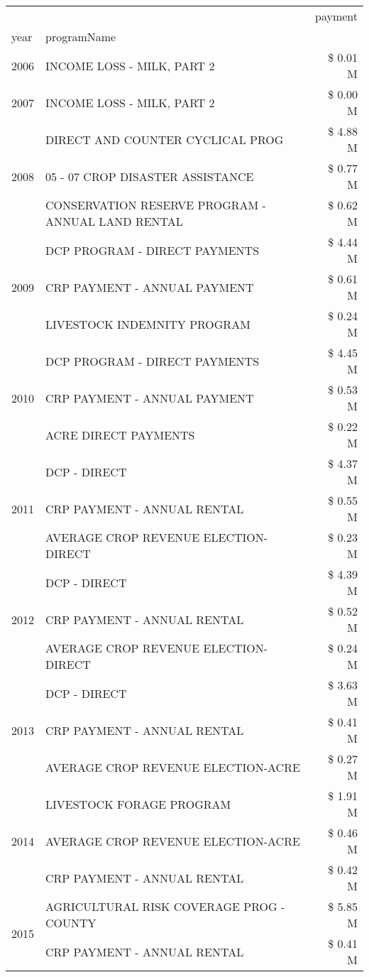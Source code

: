 \begin{tabular}{llr}
\toprule
 &  & payment \\
year & programName &  \\
\midrule
2006 & INCOME LOSS - MILK, PART 2 & \$ 0.01 M \\
\cline{1-3}
2007 & INCOME LOSS - MILK, PART 2 & \$ 0.00 M \\
\cline{1-3}
\multirow[t]{3}{*}{2008} & DIRECT AND COUNTER CYCLICAL PROG & \$ 4.88 M \\
 & 05 - 07 CROP DISASTER ASSISTANCE & \$ 0.77 M \\
 & CONSERVATION RESERVE PROGRAM - ANNUAL LAND RENTAL & \$ 0.62 M \\
\cline{1-3}
\multirow[t]{3}{*}{2009} & DCP PROGRAM - DIRECT PAYMENTS & \$ 4.44 M \\
 & CRP PAYMENT - ANNUAL PAYMENT & \$ 0.61 M \\
 & LIVESTOCK INDEMNITY PROGRAM & \$ 0.24 M \\
\cline{1-3}
\multirow[t]{3}{*}{2010} & DCP PROGRAM - DIRECT PAYMENTS & \$ 4.45 M \\
 & CRP PAYMENT - ANNUAL PAYMENT & \$ 0.53 M \\
 & ACRE DIRECT PAYMENTS & \$ 0.22 M \\
\cline{1-3}
\multirow[t]{3}{*}{2011} & DCP - DIRECT & \$ 4.37 M \\
 & CRP PAYMENT - ANNUAL RENTAL & \$ 0.55 M \\
 & AVERAGE CROP REVENUE ELECTION-DIRECT & \$ 0.23 M \\
\cline{1-3}
\multirow[t]{3}{*}{2012} & DCP - DIRECT & \$ 4.39 M \\
 & CRP PAYMENT - ANNUAL RENTAL & \$ 0.52 M \\
 & AVERAGE CROP REVENUE ELECTION-DIRECT & \$ 0.24 M \\
\cline{1-3}
\multirow[t]{3}{*}{2013} & DCP - DIRECT & \$ 3.63 M \\
 & CRP PAYMENT - ANNUAL RENTAL & \$ 0.41 M \\
 & AVERAGE CROP REVENUE ELECTION-ACRE & \$ 0.27 M \\
\cline{1-3}
\multirow[t]{3}{*}{2014} & LIVESTOCK FORAGE PROGRAM & \$ 1.91 M \\
 & AVERAGE CROP REVENUE ELECTION-ACRE & \$ 0.46 M \\
 & CRP PAYMENT - ANNUAL RENTAL & \$ 0.42 M \\
\cline{1-3}
\multirow[t]{3}{*}{2015} & AGRICULTURAL RISK COVERAGE PROG - COUNTY & \$ 5.85 M \\
 & CRP PAYMENT - ANNUAL RENTAL & \$ 0.41 M \\

\end{tabular}
